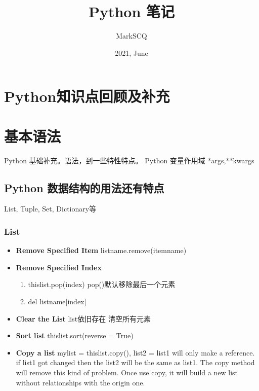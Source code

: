 \documentclass[UTF8]{article}
\title{Python 笔记}
\author{MarkSCQ}
\date{2021, June}
\begin{document}
\maketitle

\tableofcontents

\newpage

\section{Python知识点回顾及补充}
\section{基本语法}
Python 基础补充。语法，到一些特性特点。\newline
Python 变量作用域
*args,**kwargs

\subsection{Python 数据结构的用法还有特点}
List, Tuple, Set, Dictionary等
\subsubsection{List}
\begin{itemize}
    \item \textbf{Remove Specified Item} listname.remove(itemname)

    \item \textbf{Remove Specified Index} \begin{enumerate}
              \item thislist.pop(index) pop()默认移除最后一个元素
              \item del listname[index]
          \end{enumerate}
    \item \textbf{Clear the List} list依旧存在 清空所有元素
    \item \textbf{Sort list} thislist.sort(reverse = True)
    \item \textbf{Copy a list} mylist = thislist.copy(), list2 = list1 will only make a reference. if list1 got changed then the list2 will be the same as list1. The copy method will remove this kind of problem. Once use copy, it will build a new list without relationships with the origin one.
\end{itemize}
\end{document}
